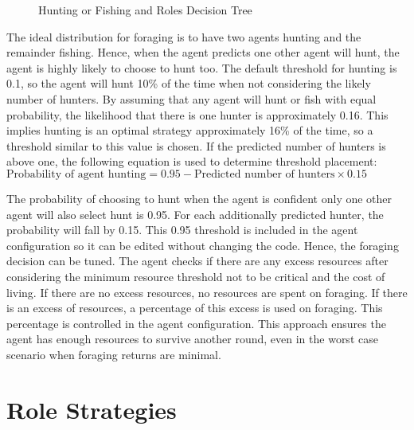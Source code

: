 \begin{figure}[!htb]
    \centering
    \caption{Hunting or Fishing and Roles Decision Tree}
\end{figure}



The ideal distribution for foraging is to have two agents hunting and the remainder fishing. Hence, when the agent predicts one other agent will hunt, the agent is highly likely to choose to hunt too. The default threshold for hunting is 0.1, so the agent will hunt 10\% of the time when not considering the likely number of hunters. By assuming that any agent will hunt or fish with equal probability, the likelihood that there is one hunter is approximately 0.16. This implies hunting is an optimal strategy approximately 16\% of the time, so a threshold similar to this value is chosen. If the predicted number of hunters is above one, the following equation is used to determine threshold placement: $\text{Probability of agent hunting} = 0.95 - \text{Predicted number of hunters} \times 0.15$

The probability of choosing to hunt when the agent is confident only one other agent will also select hunt is 0.95. For each additionally predicted hunter, the probability will fall by 0.15. This 0.95 threshold is included in the agent configuration so it can be edited without changing the code. Hence, the foraging decision can be tuned. The agent checks if there are any excess resources after considering the minimum resource threshold not to be critical and the cost of living. If there are no excess resources, no resources are spent on foraging. If there is an excess of resources, a percentage of this excess is used on foraging. This percentage is controlled in the agent configuration. This approach ensures the agent has enough resources to survive another round, even in the worst case scenario when foraging returns are minimal.

\section{Role Strategies}


